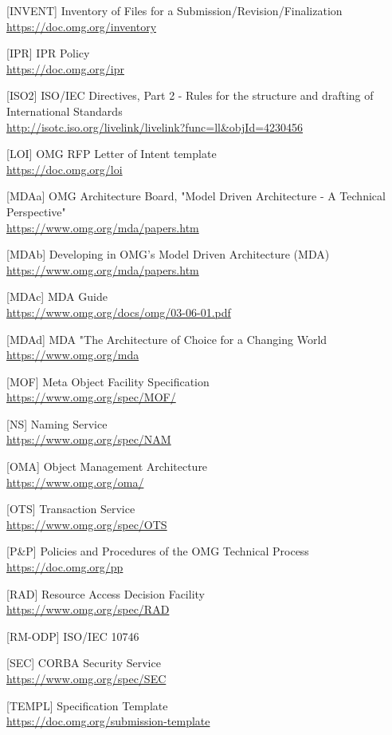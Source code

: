 \begin{appendices}
\begin{adjustwidth}{0.25in}{}
[INVENT] Inventory of Files for a Submission/Revision/Finalization\\
\url{https://doc.omg.org/inventory}

[IPR] IPR Policy\\
\url{https://doc.omg.org/ipr}

[ISO2] ISO/IEC Directives, Part 2 - Rules for the structure and drafting of International Standards\\ \url{http://isotc.iso.org/livelink/livelink?func=ll\&objId=4230456}

[LOI] OMG RFP Letter of Intent template\\
\url{https://doc.omg.org/loi}

[MDAa] OMG Architecture Board, "Model Driven Architecture - A Technical Perspective"\\
\url{https://www.omg.org/mda/papers.htm}

[MDAb] Developing in OMG's Model Driven Architecture (MDA)\\
\url{https://www.omg.org/mda/papers.htm}

[MDAc] MDA Guide\\
\url{https://www.omg.org/docs/omg/03-06-01.pdf}

[MDAd] MDA "The Architecture of Choice for a Changing World\\
\url{https://www.omg.org/mda}

[MOF] Meta Object Facility Specification\\
\url{https://www.omg.org/spec/MOF/}

[NS] Naming Service\\
\url{https://www.omg.org/spec/NAM}

[OMA] Object Management Architecture\\
\url{https://www.omg.org/oma/}

[OTS] Transaction Service\\
\url{https://www.omg.org/spec/OTS}

[P\&P] Policies and Procedures of the OMG Technical Process\\
\url{https://doc.omg.org/pp}

[RAD] Resource Access Decision Facility \\
\url{https://www.omg.org/spec/RAD}

[RM-ODP] ISO/IEC 10746

[SEC] CORBA Security Service \\ \url{https://www.omg.org/spec/SEC}

[TEMPL] Specification Template \\
\url{https://doc.omg.org/submission-template}


\end{adjustwidth}
\end{appendices}

